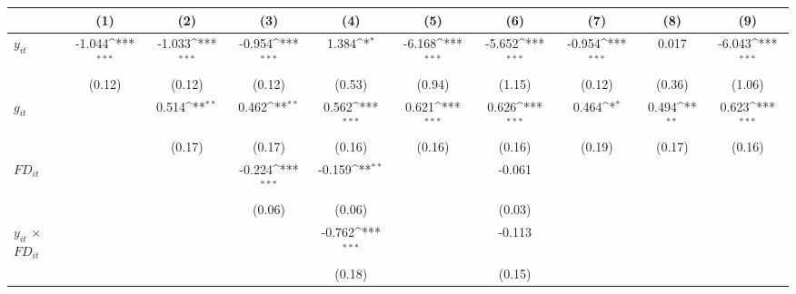 \documentclass[12pt, a4paper]{article}
\begin{document}
	\begin{table}[htbp]
	\centering
	\scriptsize
	\setlength\tabcolsep{1pt}	
	\begin{threeparttable}
		{
			\def\sym#1{\ifmmode^{#1}\else\(^{#1}\)\fi}
			\begin{tabular}{l*{9}{c}}
				\hline\hline
				&\multicolumn{1}{c}{(1)}&\multicolumn{1}{c}{(2)}&\multicolumn{1}{c}{(3)}&\multicolumn{1}{c}{(4)}&\multicolumn{1}{c}{(5)}&\multicolumn{1}{c}{(6)}&\multicolumn{1}{c}{(7)}&\multicolumn{1}{c}{(8)}&\multicolumn{1}{c}{(9)}\\
				\hline
				$y_{it}$               &      -1.044\sym{***}&      -1.033\sym{***}&      -0.954\sym{***}&       1.384\sym{*}  &      -6.168\sym{***}&      -5.652\sym{***}&      -0.954\sym{***}&       0.017         &      -6.043\sym{***}\\
				&      (0.12)         &      (0.12)         &      (0.12)         &      (0.53)         &      (0.94)         &      (1.15)         &      (0.12)         &      (0.36)         &      (1.06)         \\
				$g_{it}$            &                     &       0.514\sym{**} &       0.462\sym{**} &       0.562\sym{***}&       0.621\sym{***}&       0.626\sym{***}&       0.464\sym{*}  &       0.494\sym{**} &       0.623\sym{***}\\
				&                     &      (0.17)         &      (0.17)         &      (0.16)         &      (0.16)         &      (0.16)         &      (0.19)         &      (0.17)         &      (0.16)         \\
				$FD_{it}$                &                     &                     &      -0.224\sym{***}&      -0.159\sym{**} &                     &      -0.061         &                     &                     &                     \\
				&                     &                     &      (0.06)         &      (0.06)         &                     &      (0.03)         &                     &                     &                     \\
				$y_{it}$ $\times$ $FD_{it}$ &                     &                     &                     &      -0.762\sym{***}&                     &      -0.113         &                     &                     &                     \\
				&                     &                     &                     &      (0.18)         &                     &      (0.15)         &                     &                     &                     \\

\end{tabular}}
\end{threeparttable}
\end{table}
\end{document}
